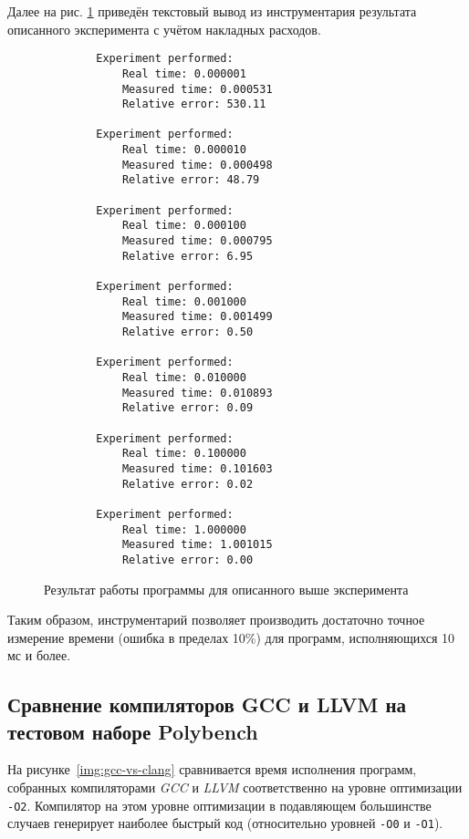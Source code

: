 Далее на рис. \ref{img:default_calibration} приведён текстовый вывод из инструментария результата описанного эксперимента с учётом накладных расходов.

\begin{figure}[tbp]
    \fontsize{12}{15}
    \begin{verbatim}
        Experiment performed:
            Real time: 0.000001
            Measured time: 0.000531
            Relative error: 530.11
        
        Experiment performed:
            Real time: 0.000010
            Measured time: 0.000498
            Relative error: 48.79
        
        Experiment performed:
            Real time: 0.000100
            Measured time: 0.000795
            Relative error: 6.95
        
        Experiment performed:
            Real time: 0.001000
            Measured time: 0.001499
            Relative error: 0.50
        
        Experiment performed:
            Real time: 0.010000
            Measured time: 0.010893
            Relative error: 0.09
        
        Experiment performed:
            Real time: 0.100000
            Measured time: 0.101603
            Relative error: 0.02
        
        Experiment performed:
            Real time: 1.000000
            Measured time: 1.001015
            Relative error: 0.00
    \end{verbatim}
    \caption{Результат работы программы для описанного выше эксперимента}
    \label{img:default_calibration}
\end{figure}

Таким образом, инструментарий позволяет производить достаточно точное измерение времени (ошибка в пределах 10\%) для программ, исполняющихся 10 мс и более.


\subsection{Сравнение компиляторов GCC и LLVM на тестовом наборе Polybench}
\label{series-llvm-vs-gcc}
На рисунке~\ref{img:gcc-vs-clang} сравнивается время исполнения программ, собранных компиляторами \textit{GCC} и \textit{LLVM} соответственно на уровне оптимизации \texttt{-O2}. Компилятор на этом уровне оптимизации в подавляющем большинстве случаев генерирует наиболее быстрый код (относительно уровней \texttt{-O0} и \texttt{-O1}).

